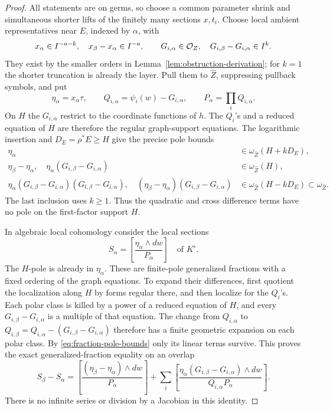 \begin{proof}
All statements are on germs, so choose a common parameter shrink and
simultaneous shorter lifts of the finitely many sections \(x,t_i\).
Choose local ambient representatives near \(E\), indexed by \(\alpha\),
with
\begin{equation}\label{eq:shorter-representatives}
 x_\alpha\in I^{-a-k},\quad x_\beta-x_\alpha\in I^{-a},\qquad
 G_{i,\alpha}\in\mathcal O_Z,\quad G_{i,\beta}-G_{i,\alpha}\in I^k.
\end{equation}
They exist by the smaller orders in Lemma~\ref{lem:obstruction-derivation};
for \(k=1\) the shorter truncation is already the layer.  Pull them to
\(\widehat Z\), suppressing pullback symbols, and put
\[
 \eta_\alpha=x_\alpha\tau,\qquad
 Q_{i,\alpha}=\psi_i(w)-G_{i,\alpha},\qquad
 P_\alpha=\prod_i Q_{i,\alpha}.
\]
On \(H\) the \(G_{i,\alpha}\) restrict to the coordinate functions of
\(h\).  The \(Q_i\)'s and a reduced equation of \(H\) are therefore
the regular graph-support equations.  The logarithmic insertion and
\(D_E=\rho^*E\geq H\) give the precise pole bounds
\begin{align}
 \eta_\alpha&\in\omega_{\widehat Z}(H+kD_E),\nonumber\\
 \eta_\beta-\eta_\alpha,\quad
 \eta_\alpha(G_{i,\beta}-G_{i,\alpha})
 &\in\omega_{\widehat Z}(H),\label{eq:fraction-pole-bounds}\\
 \eta_\alpha(G_{i,\beta}-G_{i,\alpha})(G_{l,\beta}-G_{l,\alpha}),
 \quad(\eta_\beta-\eta_\alpha)(G_{i,\beta}-G_{i,\alpha})
 &\in\omega_{\widehat Z}(H-kD_E)\subset\omega_{\widehat Z}.
 \nonumber
\end{align}
The last inclusion uses \(k\geq1\).  Thus the quadratic and cross
difference terms have no pole on the first-factor support \(H\).

In algebraic local cohomology consider the local sections
\[
 S_\alpha=\left[\frac{\eta_\alpha\wedge dw}{P_\alpha}\right]
 \quad\text{of }K^\flat.
\]
The \(H\)-pole is already in \(\eta_\alpha\).  These are finite-pole
generalized fractions with a fixed ordering of the graph equations.
To expand their differences, first quotient the localization along
\(H\) by forms regular there, and then localize for the \(Q_i\)'s.
Each polar class is killed by a power of a reduced equation of \(H\),
and every \(G_{i,\beta}-G_{i,\alpha}\) is a multiple of that equation.
The change from \(Q_{i,\alpha}\) to
\(Q_{i,\beta}=Q_{i,\alpha}-(G_{i,\beta}-G_{i,\alpha})\) therefore has
a finite geometric expansion on each polar class.  By
\eqref{eq:fraction-pole-bounds} only its linear terms survive.  This
proves the exact generalized-fraction equality on an overlap
\begin{equation}\label{eq:fraction-difference}
 S_\beta-S_\alpha=
 \left[\frac{(\eta_\beta-\eta_\alpha)\wedge dw}{P_\alpha}\right]
 +\sum_i\left[
 \frac{\eta_\alpha(G_{i,\beta}-G_{i,\alpha})\wedge dw}
 {Q_{i,\alpha}P_\alpha}\right].
\end{equation}
There is no infinite series or division by a Jacobian in this identity.


\end{proof}
